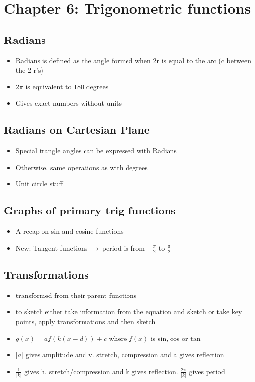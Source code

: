 \documentclass{article}
\newcommand{\rt}{$\to\ $}
\begin{document}
    \section{Chapter 6: Trigonometric functions}

    \subsection{Radians}
    \begin{itemize}
        \item Radians is defined as the angle formed when 2r is equal to the arc (c between the 2 r's)
        \item $2\pi$ is equivalent to 180 degrees
        \item Gives exact numbers without units
    \end{itemize}

    \subsection{Radians on Cartesian Plane}
    \begin{itemize}
        \item Special trangle angles can be expressed with Radians
        \item Otherwise, same operations as with degrees
        \item Unit circle stuff
    \end{itemize}

    \subsection{Graphs of primary trig functions}
    \begin{itemize}
        \item A recap on sin and cosine functions
        \item New: Tangent functions \rt period is from $-\frac{\pi}{2}$ to $\frac{\pi}{2}$
    \end{itemize}

    \subsection{Transformations}
    \begin{itemize}
        \item transformed from their parent functions
        \item to sketch either take information from the equation and sketch or take key points, apply transformations and then sketch
        \item $g(x) = af(k(x-d)) + c$ where $f(x)$ is sin, cos or tan 
        \item $|a|$ gives amplitude and v. stretch, compression and a gives reflection
        \item $\frac{1}{|k|}$ gives h. stretch/compression and k gives reflection. $\frac{2\pi}{|k|}$ gives period
    \end{itemize}
\end{document}

